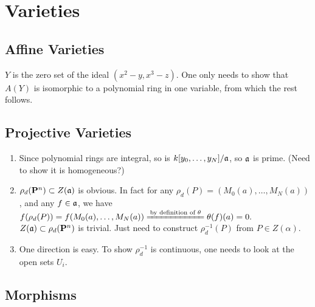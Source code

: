 \documentclass{note}
\newcommand{\Proj}[1]{\mathbf{P}^{#1}}
\begin{document}
\chapter{Varieties}

\section{Affine Varieties}
$Y$ is the zero set of the ideal $(x^2-y,x^3-z)$. One only needs to
show that $A(Y)$ is isomorphic to a polynomial ring in one variable,
from which the rest follows.

\section{Projective Varieties}
\begin{enumerate}
\item Since polynomial rings are integral, so is
  $k[y_0,\dots,y_N]/\mathfrak{a}$, so $\mathfrak{a}$ is prime. (Need to show
  it is homogeneous?)
\item $\rho_d(\Proj{n})\subset Z(\ideal{a})$ is obvious. In fact for
  any $\rho_d(P)=(M_0(a),\dots,M_N(a))$, and any $f\in\mathfrak{a}$, we
  have
  $f(\rho_d(P)) = f(M_0(a),\dots,M_N(a)) \xlongequal{\text{by
      definition of }\theta} \theta(f)(a) = 0.$\\
  $Z(\ideal{a})\subset\rho_d(\Proj{n})$ is trivial. Just need to
  construct $\rho_d^{-1}(P)$ from $P\in Z(\alpha)$.
\item One direction is easy. To show $\rho_d^{-1}$ is continuous, one
  needs to look at the open sets $U_i$.
\end{enumerate}

\section{Morphisms}

\end{document}
